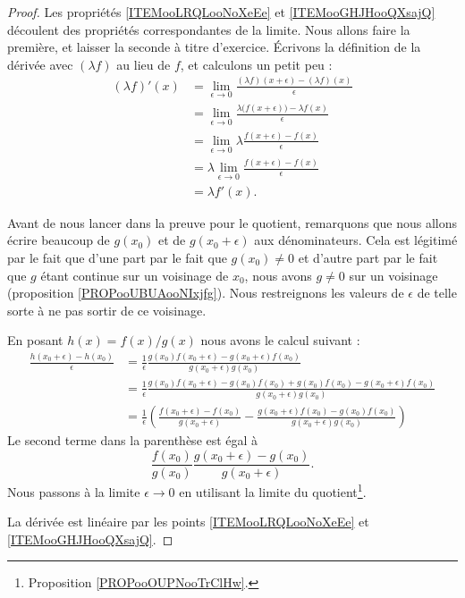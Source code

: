 \begin{proof}
    Les propriétés \ref{ITEMooLRQLooNoXeEe} et \ref{ITEMooGHJHooQXsajQ} découlent des propriétés correspondantes de la limite. Nous allons faire la première, et laisser la seconde à titre d'exercice. Écrivons la définition de la dérivée avec $(\lambda f)$ au lieu de $f$, et calculons un petit peu :
    \begin{subequations}
        \begin{align}
            (\lambda f)'(x) &=\lim_{\epsilon\to 0}\frac{ (\lambda f)(x+\epsilon)-(\lambda f)(x) }{ \epsilon }\\
                    &=\lim_{\epsilon\to 0}\frac{ \lambda \big( f(x+\epsilon) \big)-\lambda f(x) }{ \epsilon }\\
                    &=\lim_{\epsilon\to 0}\lambda \frac{ f(x+\epsilon) -f(x) }{ \epsilon }\\
                    &=\lambda \lim_{\epsilon\to 0}\frac{ f(x+\epsilon) -f(x) }{ \epsilon }\\
                    &=\lambda f'(x).
        \end{align}
    \end{subequations}

    Avant de nous lancer dans la preuve pour le quotient, remarquons que nous allons écrire beaucoup de \( g(x_0)\) et de \( g(x_0+\epsilon)\) aux dénominateurs. Cela est légitimé par le fait que d'une part par le fait que \( g(x_0)\neq 0\) et d'autre part par le fait que \( g\) étant continue sur un voisinage de \( x_0\), nous avons \( g\neq 0\) sur un voisinage (proposition \ref{PROPooUBUAooNIxjfg}). Nous restreignons les valeurs de \( \epsilon\) de telle sorte à ne pas sortir de ce voisinage.

    En posant \( h(x)=f(x)/g(x)\) nous avons le calcul suivant :
    \begin{subequations}
        \begin{align}
            \frac{ h(x_0+\epsilon)-h(x_0) }{ \epsilon }&=\frac{1}{ \epsilon }\frac{ g(x_0)f(x_0+\epsilon)-g(x_0+\epsilon)f(x_0) }{ g(x_0+\epsilon)g(x_0) }\\
            &=\frac{1}{ \epsilon }\frac{ g(x_0)f(x_0+\epsilon)-g(x_0)f(x_0)+g(x_0)f(x_0)-g(x_0+\epsilon)f(x_0) }{ g(x_0+\epsilon)g(x_0) }\\
            &=\frac{1}{ \epsilon }\left( \frac{ f(x_0+\epsilon)-f(x_0) }{ g(x_0+\epsilon) }- \frac{ g(x_0+\epsilon)f(x_0)-g(x_0)f(x_0) }{ g(x_0+\epsilon)g(x_0) } \right)
        \end{align}
    \end{subequations}
    Le second terme dans la parenthèse est égal à
    \begin{equation}
        \frac{ f(x_0) }{ g(x_0) }\frac{ g(x_0+\epsilon)-g(x_0) }{ g(x_0+\epsilon) }.
    \end{equation}
    Nous passons à la limite \( \epsilon\to 0\) en utilisant la limite du quotient\footnote{Proposition \ref{PROPooOUPNooTrClHw}.}.

    La dérivée est linéaire par les points \ref{ITEMooLRQLooNoXeEe} et \ref{ITEMooGHJHooQXsajQ}.
\end{proof}

